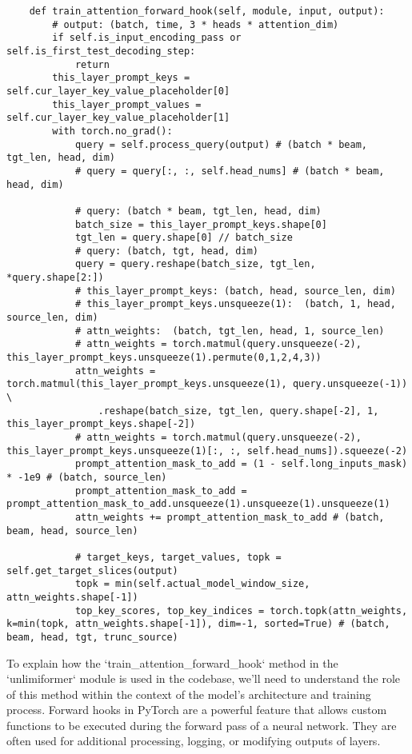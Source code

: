 \documentclass[12pt]{article}
\begin{document}
\begin{lstlisting}
    def train_attention_forward_hook(self, module, input, output):
        # output: (batch, time, 3 * heads * attention_dim)
        if self.is_input_encoding_pass or self.is_first_test_decoding_step:
            return
        this_layer_prompt_keys = self.cur_layer_key_value_placeholder[0]
        this_layer_prompt_values = self.cur_layer_key_value_placeholder[1]
        with torch.no_grad():
            query = self.process_query(output) # (batch * beam, tgt_len, head, dim)
            # query = query[:, :, self.head_nums] # (batch * beam, head, dim)
            
            # query: (batch * beam, tgt_len, head, dim)
            batch_size = this_layer_prompt_keys.shape[0]
            tgt_len = query.shape[0] // batch_size
            # query: (batch, tgt, head, dim)
            query = query.reshape(batch_size, tgt_len, *query.shape[2:])
            # this_layer_prompt_keys: (batch, head, source_len, dim)
            # this_layer_prompt_keys.unsqueeze(1):  (batch, 1, head, source_len, dim)
            # attn_weights:  (batch, tgt_len, head, 1, source_len)
            # attn_weights = torch.matmul(query.unsqueeze(-2), this_layer_prompt_keys.unsqueeze(1).permute(0,1,2,4,3))
            attn_weights = torch.matmul(this_layer_prompt_keys.unsqueeze(1), query.unsqueeze(-1)) \
                .reshape(batch_size, tgt_len, query.shape[-2], 1, this_layer_prompt_keys.shape[-2])
            # attn_weights = torch.matmul(query.unsqueeze(-2), this_layer_prompt_keys.unsqueeze(1)[:, :, self.head_nums]).squeeze(-2) 
            prompt_attention_mask_to_add = (1 - self.long_inputs_mask) * -1e9 # (batch, source_len)
            prompt_attention_mask_to_add = prompt_attention_mask_to_add.unsqueeze(1).unsqueeze(1).unsqueeze(1)
            attn_weights += prompt_attention_mask_to_add # (batch, beam, head, source_len)

            # target_keys, target_values, topk = self.get_target_slices(output)
            topk = min(self.actual_model_window_size, attn_weights.shape[-1])
            top_key_scores, top_key_indices = torch.topk(attn_weights, k=min(topk, attn_weights.shape[-1]), dim=-1, sorted=True) # (batch, beam, head, tgt, trunc_source)

\end{lstlisting}

To explain how the `train\_attention\_forward\_hook` method in the
`unlimiformer` module is used in the codebase, we'll need to understand the
role of this method within the context of the model's architecture and training
process. Forward hooks in PyTorch are a powerful feature that allows custom
functions to be executed during the forward pass of a neural network. They are
often used for additional processing, logging, or modifying outputs of layers.
\end{document}
